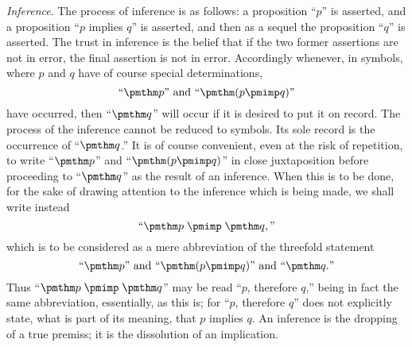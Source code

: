 \documentclass[letterpaper,12pt,openany,leqno]{book}
\begin{document}
\textit{Inference}. The process of inference is as follows: a proposition ``$p$'' is asserted, and a proposition ``$p$ implies $q$'' is asserted, and then as a sequel the proposition ``$q$'' is asserted. The trust in inference is the belief that if the two former assertions are not in error, the final assertion is not in error. Accordingly whenever, in symbols, where $p$ and $q$ have of course special determinations,
\[ 
	\text{``}\pmthm p\text{''} \text{ and } \text{``}\pmthm (p \pmimp q)\text{''}
\]
have occurred, then ``$\pmthm q$'' will occur if it is desired to put it on record. The process of the inference cannot be reduced to symbols. Its sole record is the occurrence of ``$\pmthm q$.'' It is of course convenient, even at the risk of repetition, to write ``$\pmthm p$'' and ``$\pmthm (p \pmimp q)$'' in close juxtaposition before proceeding to ``$\pmthm q$'' as the result of an inference. When this is to be done, for the sake of drawing attention to the inference which is being made, we shall write instead
\[ 
	\text{``} \pmthm p \;\pmimp\; \pmthm q,\text{''}
\]
which is to be considered as a mere abbreviation of the threefold statement
\[ 
	\text{``} \pmthm p\text{''} \text{ and } \text{``} \pmthm (p \pmimp q)\text{''} \text{ and } \text{``} \pmthm q.\text{''}
\]
Thus ``$\pmthm p \;\pmimp\; \pmthm q$'' may be read ``$p$, therefore $q$,'' being in fact the same abbreviation, essentially, as this is; for ``$p$, therefore $q$'' does not explicitly state, what is part of its meaning, that $p$ implies $q$. An inference is the dropping of a true premiss; it is the dissolution of an implication.
\end{document}
